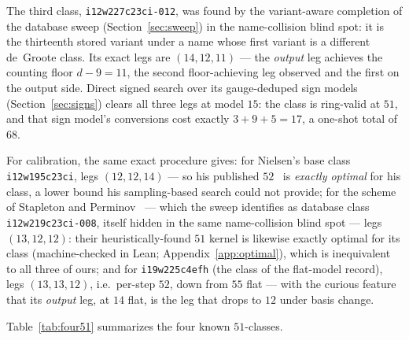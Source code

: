 \documentclass[11pt]{article}
\theoremstyle{definition}
\theoremstyle{remark}
\begin{document}
The third class, \texttt{i12w227c23ci-012}, was found by the
variant-aware completion of the database sweep
(Section~\ref{sec:sweep}) in the name-collision blind spot: it is the thirteenth stored variant under
a name whose first variant is a different de~Groote class.  Its exact
legs are $(14,12,11)$ --- the \emph{output} leg achieves the counting
floor $d-9=11$, the second floor-achieving leg observed and the first
on the output side.  Direct signed search over its gauge-deduped sign
models (Section~\ref{sec:signs}) clears all three legs at model $15$:
the class is ring-valid at $51$, and that sign model's conversions
cost exactly $3+9+5=17$, a one-shot total of $68$.

For calibration, the same exact procedure gives: for Nielsen's base
class \texttt{i12w195c23ci}, legs $(12,12,14)$ --- so his published
$52$~\cite{Nielsen26} is \emph{exactly optimal} for his class, a lower
bound his sampling-based search could not provide; for the scheme of
Stapleton and Perminov~\cite{SP26} --- which the sweep identifies as
database class \texttt{i12w219c23ci-008}, itself hidden in the same
name-collision blind spot --- legs $(13,12,12)$: their
heuristically-found $51$ kernel is likewise exactly optimal for its
class (machine-checked in Lean; Appendix~\ref{app:optimal}), which is
inequivalent to all three of ours; and for
\texttt{i19w225c4efh} (the class of the flat-model record), legs
$(13,13,12)$, i.e.\ per-step $52$, down from $55$ flat --- with the
curious feature that its \emph{output} leg, at $14$ flat, is the leg
that drops to $12$ under basis change.

Table~\ref{tab:four51} summarizes the four known $51$-classes.
\end{document}
